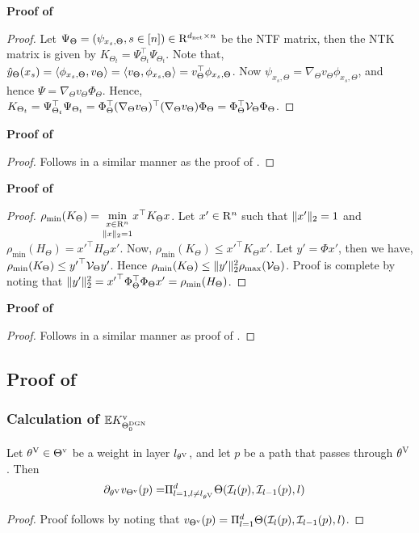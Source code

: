 \begin{appendix}
    \textbf{Proof of }
\begin{proof}
Let $\Psi_{\Theta}=(\psi_{x_s,\Theta},s\in[n])\in\mathrm{R}^{d_{\text{net}}\times n}$ be the NTF matrix, then the NTK matrix is given by $K_{\Theta_t}=\Psi^\top_{\Theta_t}\Psi_{\Theta_t}$. Note that, $\hat{y}_{\Theta}(x_s)=\langle \phi_{x_s,\Theta},v_{\Theta}\rangle=\langle v_{\Theta},\phi_{x_s,\Theta}\rangle=v^\top_{\Theta}\phi_{x_s,\Theta}$. Now $\psi_{x_{s},\Theta}=\nabla_{\Theta} v_{\Theta}\phi_{x_s,\Theta}$, and hence $\Psi=\nabla_{\Theta} v_{\Theta}\Phi_{\Theta}$. Hence, $K_{\Theta_t}=\Psi^\top_{\Theta_t}\Psi_{\Theta_t}=\Phi^\top_{\Theta}(\nabla_{\Theta} v_{\Theta})^\top (\nabla_{\Theta} v_{\Theta})\Phi_{\Theta}=\Phi^\top_{\Theta}\mathcal{V}_{\Theta}\Phi_{\Theta}$.
\end{proof}

\textbf{Proof of }

\begin{proof}
Follows in a similar manner as the proof of .
\end{proof}

\textbf{Proof of {}}
\begin{proof}
$\rho_{\min}(K_{\Theta})=\underset{\|x\|_2=1}{\underset{x\in \mathrm{R}^n}\min}x^\top K_{\Theta} x$. Let $x'\in\mathrm{R}^n$ such that $\|x'\|_2=1$ and $\rho_{\min}(H_{\Theta})={x'}^\top H_{\Theta} x'$. Now, $\rho_{\min}(K_{\Theta})\leq {x'}^\top K_{\Theta} x'$. 
Let $y'=\Phi x'$, then we have, $\rho_{\min}(K_{\Theta})\leq {y'}^\top \mathcal{V}_{\Theta}y'$. Hence $\rho_{\min}(K_{\Theta})\leq \|y'\|^2_2 \rho_{\max}(\mathcal{V}_{\Theta})$. Proof is complete by noting that $\|y'\|^2_2={x'}^\top \Phi^\top_{\Theta}\Phi_{\Theta}x'= \rho_{\min}(H_{\Theta})$.
\end{proof}


\textbf{Proof of }

\begin{proof}
Follows in a similar manner as proof of .
\end{proof}

\subsection{Proof of }
\subsubsection{Calculation of $\mathbb{E}{K^\text{v}_{\Theta^{\text{DGN}}_0}}$}

\begin{proposition}
Let ${\theta^{\text{V}}}\in{\Theta}^{\text{v}}$ be a weight in layer $l_{{\theta^{\text{V}}}}$, and let $p$ be a path that passes through ${\theta^{\text{V}}}$. Then 
\begin{align}
\partial_{{\theta^{\text{V}}}} v_{{\Theta}^{\text{v}}}(p) =& \Pi_{l=1,l\neq l_{{\theta^{\text{V}}}}}^{d} \Theta(\mathcal{I}_{l}(p),\mathcal{I}_{l-1}(p),l )
\end{align}
\end{proposition}
\begin{proof}
Proof follows by noting that $v_{{\Theta}^{\text{v}}}(p)=\Pi_{l=1}^{d}\Theta(\mathcal{I}_l(p),\mathcal{I}_{l-1}(p),l)$.
\end{proof}



\end{appendix}
